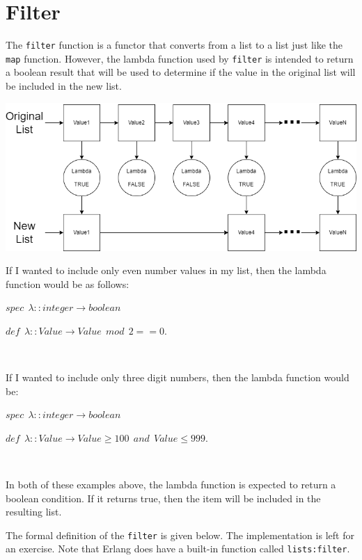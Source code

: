 \documentclass[
]{book}
\begin{document}
\hypertarget{filter}{%
\section{Filter}\label{filter}}

The \texttt{filter} function is a functor that converts from a list to a list just like the \texttt{map} function. However, the lambda function used by \texttt{filter} is intended to return a boolean result that will be used to determine if the value in the original list will be included in the new list.

\includegraphics{images/filter.drawio.png}

If I wanted to include only even number values in my list, then the lambda function would be as follows:

\begin{formulabox}
\(spec ~ ~ \lambda :: integer \rightarrow boolean\)

\(de\mathit{f} ~ ~ \lambda :: Value \rightarrow Value ~ ~ mod ~ ~ 2 == 0.\)

\end{formulabox}

\(\nonumber\)

If I wanted to include only three digit numbers, then the lambda function would be:

\begin{formulabox}
\(spec ~ ~ \lambda :: integer \rightarrow boolean\)

\(de\mathit{f} ~ ~ \lambda :: Value \rightarrow Value \ge 100 ~ ~ and ~ ~ Value \le 999.\)

\end{formulabox}

\(\nonumber\)

In both of these examples above, the lambda function is expected to return a boolean condition. If it returns true, then the item will be included in the resulting list.

The formal definition of the \texttt{filter} is given below. The implementation is left for an exercise. Note that Erlang does have a built-in function called \texttt{lists:filter}.
\end{document}
